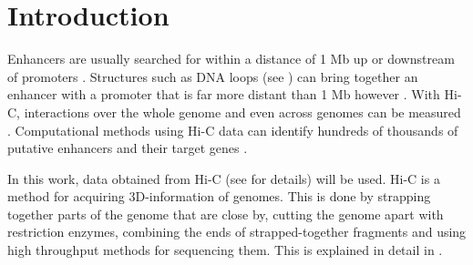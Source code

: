 \chapter{Introduction}\label{chap:introduction}

%
%
%
%
%
%


Enhancers are usually searched for within a distance of 1 Mb up or downstream
of promoters \cite{pennacchio2013enhancers}. Structures such as DNA loops (see
) can bring together an enhancer with a promoter
that is far more distant than 1 Mb however \cite{pennacchio2013enhancers}. With
Hi-C, interactions over the whole genome \cite{lieberman2009comprehensive} and
even across genomes can be measured \cite{rao20143d}. Computational methods
using Hi-C data can identify hundreds of thousands of putative enhancers and
their target genes \cite{ron2017promoter}.

In this work, data obtained from Hi-C (see  for
details) will be used. Hi-C is a method for acquiring 3D-information of genomes.
This is done by strapping together parts of the genome that are close by,
cutting the genome apart with restriction enzymes, combining the ends of
strapped-together fragments and using high throughput methods for sequencing
them. This is explained in detail in .


